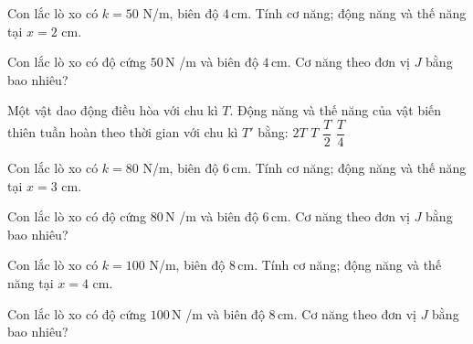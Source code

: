 \begin{bt}
Con lắc lò xo có $k=50$ N/m, biên độ $4\,\text{cm}$. Tính cơ năng; động năng và thế năng tại $x=2$ cm.
\end{bt}

\begin{ex}
Con lắc lò xo có độ cứng $50\,\text{N}$ /m và biên độ $4\,\text{cm}$. Cơ năng theo đơn vị $J$ bằng bao nhiêu?
\end{ex}

\begin{ex}
Một vật dao động điều hòa với chu kì $T$. Động năng và thế năng của vật biến thiên tuần hoàn theo thời gian với chu kì $T'$ bằng:
\choice
{$2T$}
{$T$}
{\True $\dfrac{T}{2}$}
{$\dfrac{T}{4}$}
\end{ex}

\begin{bt}
Con lắc lò xo có $k=80$ N/m, biên độ $6\,\text{cm}$. Tính cơ năng; động năng và thế năng tại $x=3$ cm.
\end{bt}

\begin{ex}
Con lắc lò xo có độ cứng $80\,\text{N}$ /m và biên độ $6\,\text{cm}$. Cơ năng theo đơn vị $J$ bằng bao nhiêu?
\end{ex}

\begin{bt}
Con lắc lò xo có $k=100$ N/m, biên độ $8\,\text{cm}$. Tính cơ năng; động năng và thế năng tại $x=4$ cm.
\end{bt}

\begin{ex}
Con lắc lò xo có độ cứng $100\,\text{N}$ /m và biên độ $8\,\text{cm}$. Cơ năng theo đơn vị $J$ bằng bao nhiêu?
\end{ex}

